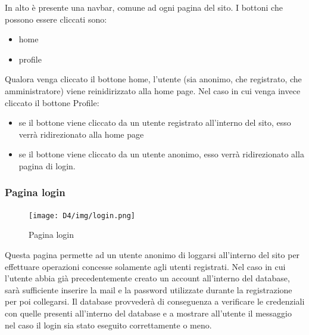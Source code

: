 \documentclass[a4paper,12pt]{article}
\begin{document}
In alto è presente una navbar, comune ad ogni pagina del sito.
I bottoni che possono essere cliccati sono:
\begin{itemize}
    \item home
    \item profile
\end{itemize}

Qualora venga cliccato il bottone home, l'utente (sia anonimo, che registrato, che amministratore) viene reinidirizzato alla home page. \newline
Nel caso in cui venga invece cliccato il bottone Profile:
\begin{itemize}
    \item se il bottone viene cliccato da un utente registrato all'interno del sito, esso verrà ridirezionato alla home page
    \item se il bottone viene cliccato da un utente anonimo, esso verrà ridirezionato alla pagina di login.
\end{itemize}

\subsubsection{Pagina login}
\begin{figure}[H]
    \centering
    \texttt{[image: D4/img/login.png]}
    \caption{Pagina login}
\end{figure}
Questa pagina permette ad un utente anonimo di loggarsi all'interno del sito per effettuare operazioni concesse solamente agli utenti registrati. \newline
Nel caso in cui l'utente abbia già precedentemente creato un account all'interno del database, sarà sufficiente inserire la mail e la password utilizzate durante la registrazione per poi collegarsi. \newline
Il database provvederà di conseguenza a verificare le credenziali con quelle presenti all'interno del database e a mostrare all'utente il messaggio nel caso il login sia stato eseguito correttamente o meno.
\end{document}
